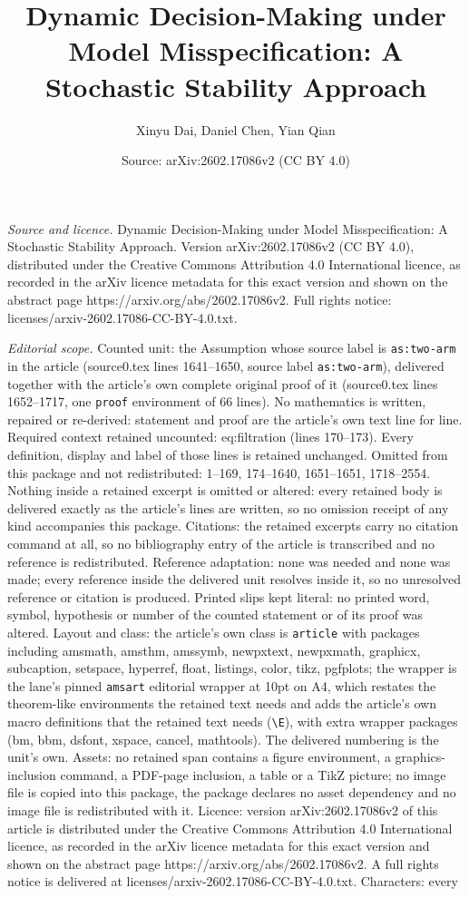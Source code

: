 \documentclass[10pt,a4paper]{amsart}
\title[Dynamic Decision-Making under Model Misspecification: A Stoc]{Dynamic Decision-Making under Model Misspecification: A Stochastic Stability Approach}
\author{Xinyu Dai, Daniel Chen, Yian Qian}
\date{Source: arXiv:2602.17086v2 (CC BY 4.0)}
\begin{document}
\maketitle

\noindent\emph{Source and licence.} Dynamic Decision-Making under Model Misspecification: A Stochastic Stability Approach. Version arXiv:2602.17086v2 (CC BY 4.0), distributed under the Creative Commons Attribution 4.0 International licence, as recorded in the arXiv licence metadata for this exact version and shown on the abstract page https://arxiv.org/abs/2602.17086v2. Full rights notice: licenses/arxiv-2602.17086-CC-BY-4.0.txt.\par\smallskip

\noindent\textit{Editorial scope.} Counted unit: the Assumption whose source label is \texttt{as:two-arm} in the article (source0.tex lines 1641--1650, source label \texttt{as:two-arm}), delivered together with the article's own complete original proof of it (source0.tex lines 1652--1717, one \texttt{proof} environment of 66 lines). No mathematics is written, repaired or re-derived: statement and proof are the article's own text line for line. Required context retained uncounted: eq:filtration (lines 170--173). Every definition, display and label of those lines is retained unchanged. Omitted from this package and not redistributed: 1--169, 174--1640, 1651--1651, 1718--2554. Nothing inside a retained excerpt is omitted or altered: every retained body is delivered exactly as the article's lines are written, so no omission receipt of any kind accompanies this package. Citations: the retained excerpts carry no citation command at all, so no bibliography entry of the article is transcribed and no reference is redistributed. Reference adaptation: none was needed and none was made; every reference inside the delivered unit resolves inside it, so no unresolved reference or citation is produced. Printed slips kept literal: no printed word, symbol, hypothesis or number of the counted statement or of its proof was altered. Layout and class: the article's own class is \texttt{article} with packages including amsmath, amsthm, amssymb, newpxtext, newpxmath, graphicx, subcaption, setspace, hyperref, float, listings, color, tikz, pgfplots; the wrapper is the lane's pinned \texttt{amsart} editorial wrapper at 10pt on A4, which restates the theorem-like environments the retained text needs and adds the article's own macro definitions that the retained text needs (\texttt{\textbackslash E}), with extra wrapper packages (bm, bbm, dsfont, xspace, cancel, mathtools). The delivered numbering is the unit's own. Assets: no retained span contains a figure environment, a graphics-inclusion command, a PDF-page inclusion, a table or a TikZ picture; no image file is copied into this package, the package declares no asset dependency and no image file is redistributed with it. Licence: version arXiv:2602.17086v2 of this article is distributed under the Creative Commons Attribution 4.0 International licence, as recorded in the arXiv licence metadata for this exact version and shown on the abstract page https://arxiv.org/abs/2602.17086v2. A full rights notice is delivered at licenses/arxiv-2602.17086-CC-BY-4.0.txt. Characters: every 
\end{document}
